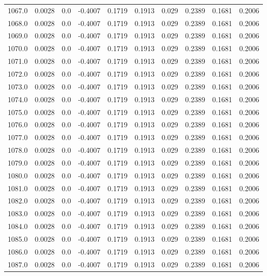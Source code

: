 \begin{longtable}{lrrrrrrrrr}
1067.0 & 0.0028 & 0.0 & -0.4007 & 0.1719 & 0.1913 & 0.029 & 0.2389 & 0.1681 & 0.2006 \\
1068.0 & 0.0028 & 0.0 & -0.4007 & 0.1719 & 0.1913 & 0.029 & 0.2389 & 0.1681 & 0.2006 \\
1069.0 & 0.0028 & 0.0 & -0.4007 & 0.1719 & 0.1913 & 0.029 & 0.2389 & 0.1681 & 0.2006 \\
1070.0 & 0.0028 & 0.0 & -0.4007 & 0.1719 & 0.1913 & 0.029 & 0.2389 & 0.1681 & 0.2006 \\
1071.0 & 0.0028 & 0.0 & -0.4007 & 0.1719 & 0.1913 & 0.029 & 0.2389 & 0.1681 & 0.2006 \\
1072.0 & 0.0028 & 0.0 & -0.4007 & 0.1719 & 0.1913 & 0.029 & 0.2389 & 0.1681 & 0.2006 \\
1073.0 & 0.0028 & 0.0 & -0.4007 & 0.1719 & 0.1913 & 0.029 & 0.2389 & 0.1681 & 0.2006 \\
1074.0 & 0.0028 & 0.0 & -0.4007 & 0.1719 & 0.1913 & 0.029 & 0.2389 & 0.1681 & 0.2006 \\
1075.0 & 0.0028 & 0.0 & -0.4007 & 0.1719 & 0.1913 & 0.029 & 0.2389 & 0.1681 & 0.2006 \\
1076.0 & 0.0028 & 0.0 & -0.4007 & 0.1719 & 0.1913 & 0.029 & 0.2389 & 0.1681 & 0.2006 \\
1077.0 & 0.0028 & 0.0 & -0.4007 & 0.1719 & 0.1913 & 0.029 & 0.2389 & 0.1681 & 0.2006 \\
1078.0 & 0.0028 & 0.0 & -0.4007 & 0.1719 & 0.1913 & 0.029 & 0.2389 & 0.1681 & 0.2006 \\
1079.0 & 0.0028 & 0.0 & -0.4007 & 0.1719 & 0.1913 & 0.029 & 0.2389 & 0.1681 & 0.2006 \\
1080.0 & 0.0028 & 0.0 & -0.4007 & 0.1719 & 0.1913 & 0.029 & 0.2389 & 0.1681 & 0.2006 \\
1081.0 & 0.0028 & 0.0 & -0.4007 & 0.1719 & 0.1913 & 0.029 & 0.2389 & 0.1681 & 0.2006 \\
1082.0 & 0.0028 & 0.0 & -0.4007 & 0.1719 & 0.1913 & 0.029 & 0.2389 & 0.1681 & 0.2006 \\
1083.0 & 0.0028 & 0.0 & -0.4007 & 0.1719 & 0.1913 & 0.029 & 0.2389 & 0.1681 & 0.2006 \\
1084.0 & 0.0028 & 0.0 & -0.4007 & 0.1719 & 0.1913 & 0.029 & 0.2389 & 0.1681 & 0.2006 \\
1085.0 & 0.0028 & 0.0 & -0.4007 & 0.1719 & 0.1913 & 0.029 & 0.2389 & 0.1681 & 0.2006 \\
1086.0 & 0.0028 & 0.0 & -0.4007 & 0.1719 & 0.1913 & 0.029 & 0.2389 & 0.1681 & 0.2006 \\
1087.0 & 0.0028 & 0.0 & -0.4007 & 0.1719 & 0.1913 & 0.029 & 0.2389 & 0.1681 & 0.2006 \\

\end{longtable}
